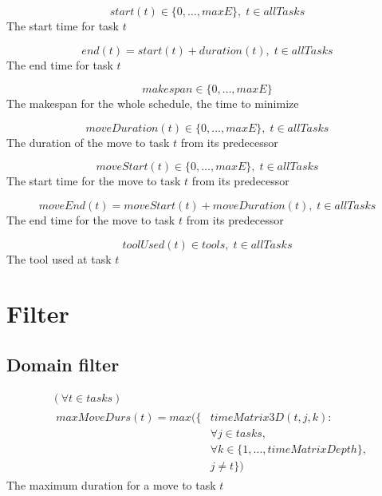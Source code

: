 \documentclass[10pt,a4paper]{report}
\begin{document}
\begin{equation}\label{eq:46}
start(t) \in \{0 , \ldots , maxE\}, \; t \in allTasks\end{equation}
The start time for task $t$

\begin{equation}\label{eq:47}
end(t) = start(t) + duration(t), \; t \in allTasks\end{equation}
The end time for task $t$

\begin{equation}\label{eq:48}
makespan \in \{0 , \ldots , maxE\}\end{equation}
The makespan for the whole schedule, the time to minimize

\begin{equation}\label{eq:49}
moveDuration(t) \in \{0 , \ldots , maxE\}, \; t \in allTasks\end{equation}
The duration of the move to task $t$ from its predecessor

\begin{equation}\label{eq:50}
moveStart(t) \in \{0 , \ldots , maxE\}, \; t \in allTasks\end{equation}
The start time for the move to task $t$ from its predecessor

\begin{equation}\label{eq:51}
moveEnd(t) = moveStart(t) + moveDuration(t), \; t \in allTasks\end{equation}
The end time for the move to task $t$ from its predecessor

\begin{equation}\label{eq:52}
toolUsed(t) \in tools, \; t \in allTasks\end{equation}
The tool used at task $t$


\section*{Filter}
\subsection*{Domain filter}

\begin{equation}
\begin{aligned}\label{eq:57}
&( \forall t \in tasks)\\
&\begin{aligned}
maxMoveDurs(t) = max(\{&timeMatrix3D(t,j,k) :\\
&\forall j \in tasks, \\
&\forall k \in \{1 , \ldots , timeMatrixDepth\},\\
&j \neq t\})
\end{aligned}
\end{aligned}
\end{equation}
The maximum duration for a move to task $t$
\end{document}
